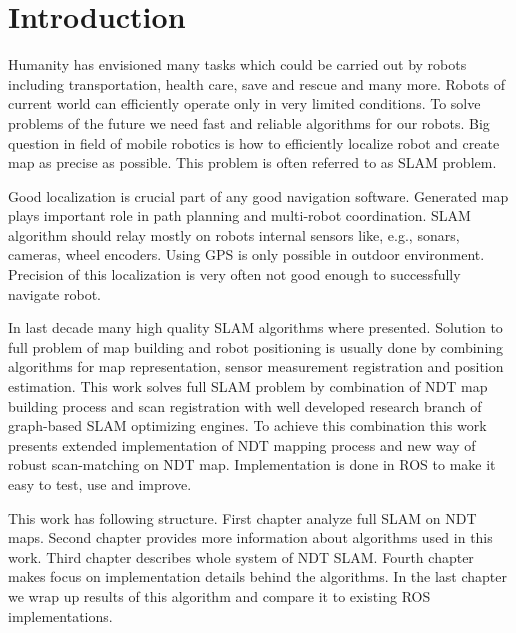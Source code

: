 \chapter*{Introduction}
Humanity has envisioned many tasks which could be carried out by robots including transportation, health care, save and rescue and many more. Robots of current world can efficiently operate only in very limited conditions. To solve problems of the future we need fast and reliable algorithms for our robots. Big question in field of mobile robotics is how to efficiently localize robot and create map as precise as possible. This problem is often referred to as \gls{SLAM} problem.

Good localization is crucial part of any good navigation software. Generated map plays important role in path planning and  multi-robot coordination. SLAM algorithm should relay mostly on robots internal sensors like, e.g., sonars, cameras, wheel encoders. Using \gls{GPS} is only possible in outdoor environment. Precision of this localization is very often not good enough to successfully navigate robot.

In last decade many high quality \gls{SLAM} algorithms where presented. Solution to full problem of map building and robot positioning is usually done by combining algorithms for map representation, sensor measurement registration and position estimation. This work solves full \gls{SLAM} problem by combination of \gls{NDT} map building process and scan registration with well developed research branch of graph-based \gls{SLAM} optimizing engines. To achieve this combination this work presents extended implementation of \gls{NDT} mapping process and new way of robust scan-matching on \gls{NDT} map. Implementation is done in \gls{ROS} to make it easy to test, use and improve.

This work has following structure. First chapter analyze full \gls{SLAM} on \gls{NDT} maps. Second chapter provides more information about algorithms used in this work. Third chapter describes whole system of NDT SLAM. Fourth chapter makes focus on implementation details behind the algorithms. In the last chapter we wrap up results of this algorithm and compare it to existing \gls{ROS} implementations.  

